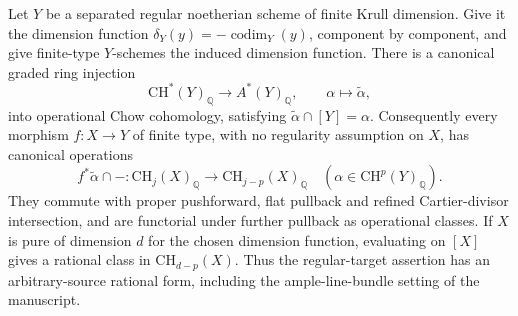 \begin{proposition}\label{B:regular-pullback}
Let $Y$ be a separated regular noetherian scheme of finite Krull dimension. Give it the dimension function $\delta_Y(y)=-\operatorname{codim}_Y(y)$, component by component, and give finite-type $Y$-schemes the induced dimension function. There is a canonical graded ring injection
\[
 \mathrm{CH}^*(Y)_{\mathbb Q}\longrightarrow A^*(Y)_{\mathbb Q},
 \qquad \alpha\longmapsto\widetilde\alpha,
\]
into operational Chow cohomology, satisfying $\widetilde\alpha\cap[Y]=\alpha$. Consequently every morphism $f:X\to Y$ of finite type, with no regularity assumption on $X$, has canonical operations
\[
 f^*\widetilde\alpha\cap-:
 \mathrm{CH}_j(X)_{\mathbb Q}\longrightarrow
 \mathrm{CH}_{j-p}(X)_{\mathbb Q}
 \quad(\alpha\in\mathrm{CH}^p(Y)_{\mathbb Q}).
\]
They commute with proper pushforward, flat pullback and refined Cartier-divisor intersection, and are functorial under further pullback as operational classes. If $X$ is pure of dimension $d$ for the chosen dimension function, evaluating on $[X]$ gives a rational class in $\mathrm{CH}_{d-p}(X)$. Thus the regular-target assertion has an arbitrary-source rational form, including the ample-line-bundle setting of the manuscript.
\end{proposition}
